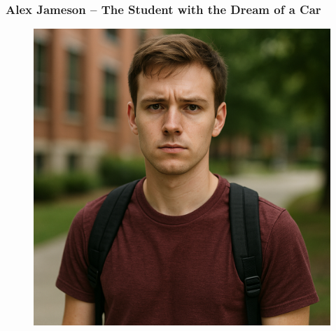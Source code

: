\documentclass[a4paper,12pt]{article}
\begin{document}
\subsubsection{Alex Jameson – The Student with the Dream of a Car}
\begin{figure}[H]
    \centering
    \includegraphics[scale=0.1]{alex.png}
\end{figure}
\end{document}

